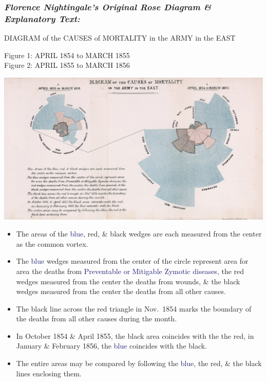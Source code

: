 \documentclass[
  dvipsnames]{article}
\providecommand{\tightlist}{%
  \setlength{\itemsep}{0pt}\setlength{\parskip}{0pt}}
\begin{document}
\hypertarget{florence-nightingales-original-rose-diagram-explanatory-text}{%
\subsubsection{\texorpdfstring{\emph{Florence Nightingale's Original
Rose Diagram \& Explanatory
Text:}}{Florence Nightingale's Original Rose Diagram \& Explanatory Text:}}\label{florence-nightingales-original-rose-diagram-explanatory-text}}

DIAGRAM of the CAUSES of MORTALITY in the ARMY in the EAST

Figure 1: APRIL 1854 to MARCH 1855\\
Figure 2: APRIL 1855 to MARCH 1856

\begin{center}\includegraphics[width=0.9\linewidth]{Rose_Diagram_rmd} \end{center}

\begin{itemize}
\tightlist
\item
  The areas of the \textcolor{MidnightBlue}{blue},
  \textcolor{Sepia}{red}, \& black wedges are each measured from the
  center as the common vortex.
\item
  The \textcolor{MidnightBlue}{blue} wedges measured from the center of
  the circle represent area for area the deaths from
  \textcolor{MidnightBlue}{Preventable or Mitigable Zymotic diseases},
  the \textcolor{Sepia}{red} wedges measured from the center the deaths
  from \textcolor{Sepia}{wounds}, \& the black wedges measured from the
  center the deaths from all other causes.
\item
  The black line across the \textcolor{Sepia}{red} triangle in Nov.~1854
  marks the boundary of the deaths from all other causes during the
  month.
\item
  In October 1854 \& April 1855, the black area coincides with the the
  \textcolor{Sepia}{red}, in January \& February 1856, the
  \textcolor{MidnightBlue}{blue} coincides with the black.
\item
  The entire areas may be compared by following the
  \textcolor{MidnightBlue}{blue}, the \textcolor{Sepia}{red}, \& the
  black lines enclosing them.
\end{itemize}
\end{document}
